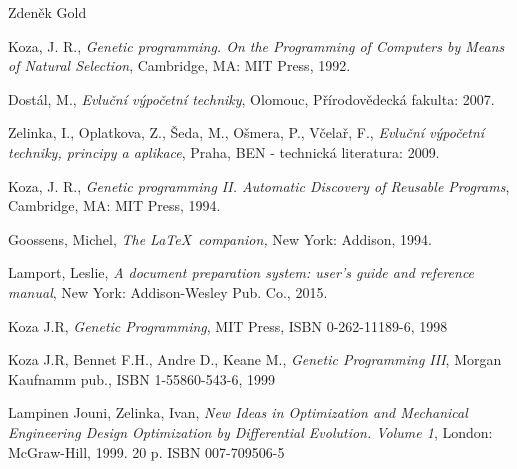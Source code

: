 \documentclass[bc,male,java,dept460]{diploma}		%
\begin{document}
\bigskip
\begin{flushright}
Zdeněk Gold
\end{flushright}

\begin{thebibliography}{99}

 Koza, J. R.,
\textit{Genetic programming. On the Programming of Computers by Means of Natural Selection},
Cambridge, MA: MIT Press, 1992.

 Dostál, M.,
\textit{Evluční výpočetní techniky},
Olomouc, Přírodovědecká fakulta: 2007.

 Zelinka, I., Oplatkova, Z., Šeda, M., Ošmera, P., Včelař, F.,
\textit{Evluční výpočetní techniky, principy a aplikace},
Praha, BEN - technická literatura: 2009.

 Koza, J. R.,
\textit{Genetic programming II. Automatic Discovery of Reusable Programs},
Cambridge, MA: MIT Press, 1994.

 Goossens, Michel,
\textit{The \LaTeX\ companion,} New York: Addison, 1994.

 Lamport, Leslie,
\textit{A document preparation system: user's guide and reference manual},
New York: Addison-Wesley Pub. Co., 2015.

 Koza J.R, 
\textit{Genetic Programming},
MIT Press, ISBN 0-262-11189-6, 1998

 Koza J.R, Bennet F.H., Andre D., Keane M.,
\textit{Genetic Programming III},
Morgan Kaufnamm pub., ISBN 1-55860-543-6, 1999

 Lampinen Jouni, Zelinka, Ivan,
\textit{New Ideas in Optimization and Mechanical Engineering Design Optimization by Differential Evolution. Volume 1},
London: McGraw-Hill, 1999. 20 p. ISBN 007-709506-5

\end{thebibliography}
\end{document}
